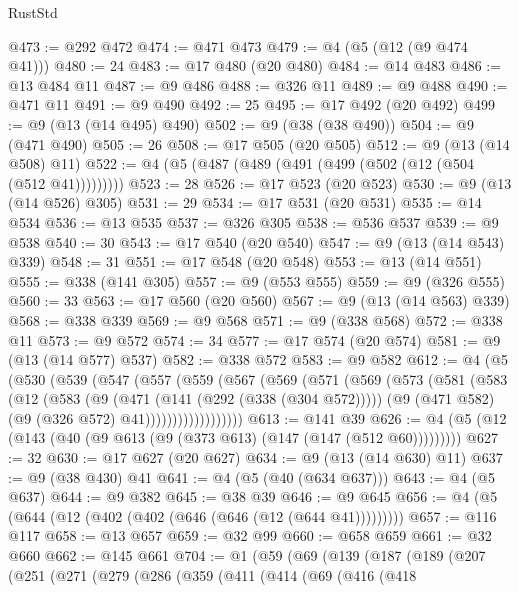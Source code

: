 \begin{lexlean}{RustStd}
\begin{coremodule}
@473 := @292 @472
@474 := @471 @473
@479 := @4 (@5 (@12 (@9 @474 @41)))
@480 := 24
@483 := @17 @480 (@20 @480)
@484 := @14 @483
@486 := @13 @484 @11
@487 := @9 @486
@488 := @326 @11
@489 := @9 @488
@490 := @471 @11
@491 := @9 @490
@492 := 25
@495 := @17 @492 (@20 @492)
@499 := @9 (@13 (@14 @495) @490)
@502 := @9 (@38 (@38 @490))
@504 := @9 (@471 @490)
@505 := 26
@508 := @17 @505 (@20 @505)
@512 := @9 (@13 (@14 @508) @11)
@522 := @4 (@5 (@487 (@489 (@491 (@499 (@502 (@12 (@504 (@512 @41)))))))))
@523 := 28
@526 := @17 @523 (@20 @523)
@530 := @9 (@13 (@14 @526) @305)
@531 := 29
@534 := @17 @531 (@20 @531)
@535 := @14 @534
@536 := @13 @535
@537 := @326 @305
@538 := @536 @537
@539 := @9 @538
@540 := 30
@543 := @17 @540 (@20 @540)
@547 := @9 (@13 (@14 @543) @339)
@548 := 31
@551 := @17 @548 (@20 @548)
@553 := @13 (@14 @551)
@555 := @338 (@141 @305)
@557 := @9 (@553 @555)
@559 := @9 (@326 @555)
@560 := 33
@563 := @17 @560 (@20 @560)
@567 := @9 (@13 (@14 @563) @339)
@568 := @338 @339
@569 := @9 @568
@571 := @9 (@338 @568)
@572 := @338 @11
@573 := @9 @572
@574 := 34
@577 := @17 @574 (@20 @574)
@581 := @9 (@13 (@14 @577) @537)
@582 := @338 @572
@583 := @9 @582
@612 := @4
    (@5
      (@530
        (@539
          (@547
            (@557
              (@559
                (@567
                  (@569
                    (@571
                      (@569
                        (@573
                          (@581
                            (@583
                              (@12
                                (@583
                                  (@9
                                    (@471 (@141 (@292 (@338 (@304 @572)))))
                                    (@9 (@471 @582) (@9 (@326 @572) @41))))))))))))))))))
@613 := @141 @39
@626 := @4 (@5 (@12 (@143 (@40 (@9 @613 (@9 (@373 @613) (@147 (@147 (@512 @60)))))))))
@627 := 32
@630 := @17 @627 (@20 @627)
@634 := @9 (@13 (@14 @630) @11)
@637 := @9 (@38 @430) @41
@641 := @4 (@5 (@40 (@634 @637)))
@643 := @4 (@5 @637)
@644 := @9 @382
@645 := @38 @39
@646 := @9 @645
@656 := @4 (@5 (@644 (@12 (@402 (@402 (@646 (@646 (@12 (@644 @41)))))))))
@657 := @116 @117
@658 := @13 @657
@659 := @32 @99
@660 := @658 @659
@661 := @32 @660
@662 := @145 @661
@704 := @1
    (@59
      (@69
        (@139
          (@187
            (@189
              (@207
                (@251
                  (@271
                    (@279
                      (@286
                        (@359
                          (@411
                            (@414
                              (@69
                                (@416
                                  (@418

\end{coremodule}
\end{lexlean}
